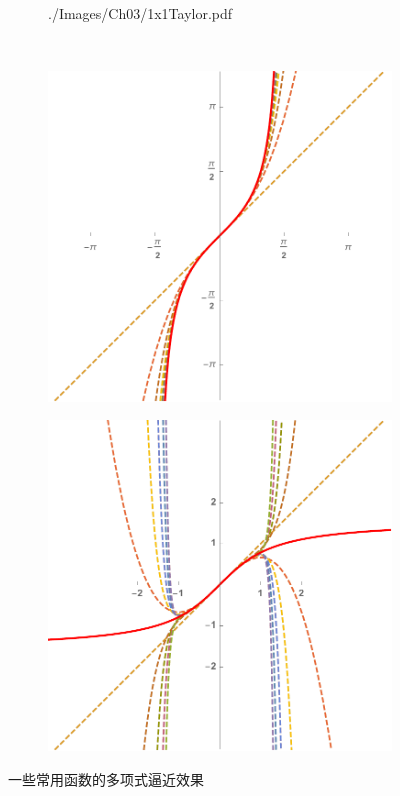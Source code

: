 \begin{figure}[h]
\begin{subfigure}[t]{0.4\textwidth}
		{./Images/Ch03/1x1Taylor.pdf}
	\end{subfigure}\\
	\begin{subfigure}[t]{0.4\textwidth}
		\centering
		\includegraphics[width=\textwidth]
		{./Images/Ch03/tanTaylor.pdf}
	\end{subfigure}
	\begin{subfigure}[t]{0.4\textwidth}
		\centering
		\includegraphics[width=\textwidth]
		{./Images/Ch03/arctanTaylor.pdf}
	\end{subfigure}
	\caption{一些常用函数的多项式逼近效果}
	\label{fig:TaylorExpand}
\end{figure}